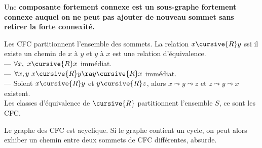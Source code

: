 \documentclass[french, 11pt]{article}
\begin{document}
\vspace*{-0.5cm}

\begin{defi}{}{}
    Une \bf{composante fortement connexe} est un sous-graphe fortement connexe auquel on ne peut pas ajouter de nouveau sommet sans retirer la forte connexité.
\end{defi}

\vspace*{-0.5cm}

\begin{prop}{}{}
    Les CFC partitionnent l'ensemble des sommets.
    \tcblower
    La relation $x\cursive{R}y$ ssi il existe un chemin de $x$ à $y$ et $y$ à $x$ est une relation d'équivalence.\\
    --- $\forall x, ~ x \cursive{R}x$ immédiat.\\
    --- $\forall x,y ~ x\cursive{R}y \ra y \cursive{R}x$ immédiat.\\
    --- Soient $x\cursive{R}y$ et $y\cursive{R}z$, alors $x\leadsto y \leadsto z$ et $z\leadsto y \leadsto x$ existent.\\
    Les classes d'équivalence de $\cursive{R}$ partitionnent l'ensemble $S$, ce sont les CFC.
\end{prop}

\vspace*{-0.5cm}

\begin{prop}{}{}
    Le graphe des CFC est acyclique.
    \tcblower
    Si le graphe contient un cycle, on peut alors exhiber un chemin entre deux sommets de CFC différentes, absurde.
\end{prop}

\vspace*{-0.5cm}
\end{document}
